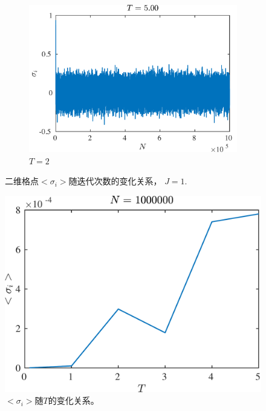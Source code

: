 \documentclass[12pt]{article}
\begin{document}
\begin{figure}
\begin{subfigure}[b]{0.49\textwidth}
		\includegraphics[width=\textwidth]{2D/2D1e7/meansigT5.pdf}
		\caption{$T=2$}
	\end{subfigure}
	\caption{二维格点$<\sigma_i>$随迭代次数的变化关系， $J=1$.}
	\label{fig:2Dmeansig}
\end{figure}

\begin{figure}[htp]
	\centering
	\includegraphics[width=12cm]{2D/2D1e7/avesig.pdf}
	\caption{$<\sigma_i>$随$T$的变化关系。}
	\label{fig:2DsigT}
\end{figure}






% 
\end{document}

